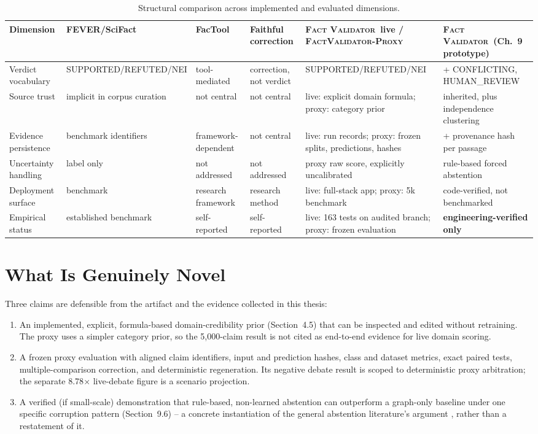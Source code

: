 \documentclass[12pt,a4paper,openany]{report}
\newcommand{\system}{\textsc{Fact Validator}}
\newcommand{\proxy}{\textsc{FactValidator-Proxy}}
\begin{document}
\begin{table}[H]
\centering
\caption{Structural comparison across implemented and evaluated dimensions.}
\label{tab:novelty-full}
\scriptsize
{}
\begin{tabularx}{\textwidth}{p{2.2cm}YYYYY}
\toprule
Dimension & FEVER/SciFact & FacTool & Faithful correction & \system\ live / \proxy & \system\ (Ch.~9 prototype) \\
\midrule
Verdict vocabulary & SUPPORTED/\allowbreak REFUTED/\allowbreak NEI & tool-mediated & correction, not verdict & SUPPORTED/\allowbreak REFUTED/\allowbreak NEI & + CONFLICTING, HUMAN\_REVIEW \\
Source trust & implicit in corpus curation & not central & not central & live: explicit domain formula; proxy: category prior & inherited, plus independence clustering \\
Evidence persistence & benchmark identifiers & framework-dependent & not central & live: run records; proxy: frozen splits, predictions, hashes & + provenance hash per passage \\
Uncertainty handling & label only & not addressed & not addressed & proxy raw score, explicitly uncalibrated & rule-based forced abstention \\
Deployment surface & benchmark & research framework & research method & live: full-stack app; proxy: 5k benchmark & code-verified, not benchmarked \\
Empirical status & established benchmark & self-reported & self-reported & live: 163 tests on audited branch; proxy: frozen evaluation & \textbf{engineering-verified only} \\
\bottomrule
\end{tabularx}
\end{table}

\section{What Is Genuinely Novel}
Three claims are defensible from the artifact and the evidence collected in this thesis:
\begin{enumerate}
  \item An implemented, explicit, formula-based domain-credibility prior (Section~4.5) that can be inspected and edited without retraining. The proxy uses a simpler category prior, so the 5{,}000-claim result is not cited as end-to-end evidence for live domain scoring.
  \item A frozen proxy evaluation with aligned claim identifiers, input and prediction hashes, class and dataset metrics, exact paired tests, multiple-comparison correction, and deterministic regeneration. Its negative debate result is scoped to deterministic proxy arbitration; the separate 8.78$\times$ live-debate figure is a scenario projection.
  \item A verified (if small-scale) demonstration that rule-based, non-learned abstention can outperform a graph-only baseline under one specific corruption pattern (Section~9.6) -- a concrete instantiation of the general abstention literature's argument \citep{wen2024abstention}, rather than a restatement of it.
\end{enumerate}
\end{document}
